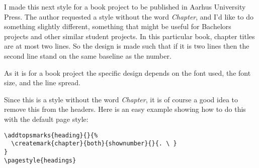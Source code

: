 \endgroup



I made this next style for a book project to be published in Aarhus
University Press. The author requested a style without the word
\emph{Chapter}, and I'd like to do something slightly different,
something that might be useful for Bachelors projects and other
similar student projects. In this particular book, chapter titles are
at most two lines. So the design is made such that if it is two lines
then the second line stand on the same baseline as the number.

As it is for a book project the specific design depends on the font
used, the font size, and the line spread. 

Since this is a style without the word \emph{Chapter}, it is of course
a good idea to remove this from the headers. Here is an easy example
showing how to do this with the default page style:
\begin{verbatim}
\addtopsmarks{heading}{}{%
  \createmark{chapter}{both}{shownumber}{}{. \ }
}
\pagestyle{headings}
\end{verbatim}


